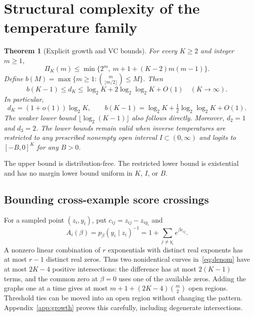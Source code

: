 \documentclass[10pt]{article}
\newtheorem{theorem}{Theorem}[section]
\theoremstyle{definition}\newtheorem{definition}[theorem]{Definition}
\theoremstyle{remark}\newtheorem{remark}[theorem]{Remark}
\newcommand{\1}{\mathbf 1}
\begin{document}
\section{Structural complexity of the temperature family}\label{sec:structure}
\begin{theorem}[Explicit growth and VC bounds]\label{thm:structural}
For every $K\ge2$ and integer $m\ge1$,
\begin{equation}\label{eq:growth}
 \Pi_K(m)\le\min\{2^m,\ m+1+(K-2)m(m-1)\}.
\end{equation}
Define $b(M)=\max\{m\ge1:\binom{m}{\lfloor m/2\rfloor}\le M\}$. Then
\begin{equation}\label{eq:vcbounds}
 b(K-1)\le d_K\le\log_2 K+2\log_2\log_2 K+O(1)
 \quad(K\to\infty).
\end{equation}
In particular,
\begin{equation}\label{eq:vcasymptotic}
 d_K=(1+o(1))\log_2 K,
 \qquad b(K-1)=\log_2 K+\tfrac12\log_2\log_2 K+O(1).
\end{equation}
The weaker lower bound $\lfloor\log_2(K-1)\rfloor$ also follows directly. Moreover, $d_2=1$ and $d_3=2$. The lower bounds remain valid when inverse temperatures are restricted to any prescribed nonempty open interval $I\subset(0,\infty)$ and logits to $[-B,0]^K$ for any $B>0$.
\end{theorem}
The upper bound is distribution-free. The restricted lower bound is existential and has no margin lower bound uniform in $K$, $I$, or $B$.

\subsection{Bounding cross-example score crossings}
For a sampled point $(z_i,y_i)$, put $c_{ij}=z_{ij}-z_{iy_i}$ and
\begin{equation}\label{eq:denom}
 A_i(\beta)=p_\beta(y_i\mid z_i)^{-1}=1+\sum_{j\ne y_i}e^{\beta c_{ij}}.
\end{equation}
A nonzero linear combination of $r$ exponentials with distinct real exponents has at most $r-1$ distinct real zeros. Thus two nonidentical curves in~\eqref{eq:denom} have at most $2K-4$ positive intersections: the difference has at most $2(K-1)$ terms, and the common zero at $\beta=0$ uses one of the available zeros. Adding the graphs one at a time gives at most $m+1+(2K-4)\binom m2$ open regions. Threshold ties can be moved into an open region without changing the pattern. Appendix~\ref{app:growth} proves this carefully, including degenerate intersections.
\end{document}
